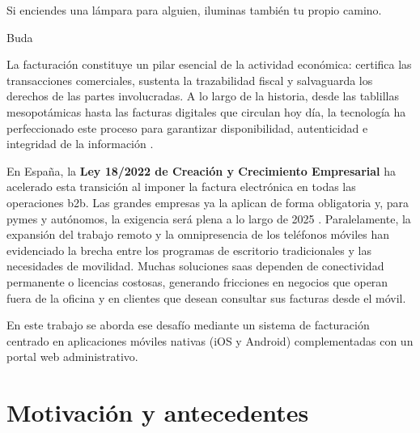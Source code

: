 \begin{large}
\epigraph{Si enciendes una lámpara para alguien, iluminas también tu propio camino.}{Buda}

La facturación constituye un pilar esencial de la actividad económica: certifica las transacciones comerciales, sustenta la trazabilidad fiscal y salvaguarda los derechos de las partes involucradas. A lo largo de la historia, desde las tablillas mesopotámicas hasta las facturas digitales que circulan hoy día, la tecnología ha perfeccionado este proceso para garantizar disponibilidad, autenticidad e integridad de la información \cite{origen_facturas}.

En España, la \textbf{Ley 18/2022 de Creación y Crecimiento Empresarial} ha acelerado esta transición al imponer la factura electrónica en todas las operaciones \gls{b2b}. Las grandes empresas ya la aplican de forma obligatoria y, para pymes y autónomos, la exigencia será plena a lo largo de 2025 \cite{ley18_2022}. Paralelamente, la expansión del trabajo remoto y la omnipresencia de los teléfonos móviles han evidenciado la brecha entre los programas de escritorio tradicionales y las necesidades de movilidad. Muchas soluciones \gls{saas} dependen de conectividad permanente o licencias costosas, generando fricciones en negocios que operan fuera de la oficina y en clientes que desean consultar sus facturas desde el móvil.

En este trabajo se aborda ese desafío mediante un sistema de facturación centrado en aplicaciones móviles nativas (iOS y Android) complementadas con un portal web administrativo.
\end{large}

\section{Motivación y antecedentes}

